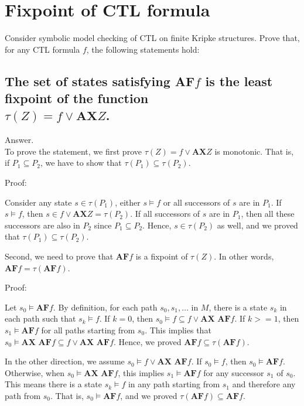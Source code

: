 \documentclass[a4paper,11pt]{article}
\theoremstyle{mytheor}
\begin{document}
\section{Fixpoint of CTL formula}
Consider symbolic model checking of CTL on finite Kripke structures. Prove that, for any CTL formula $f$, the following statements hold:

\subsection{The set of states satisfying AF$f$ is the least fixpoint of the function \\
$\tau(\mathit{Z}) = f \vee \textbf{AX}\mathit{Z}$.}
Answer.
\smallskip \\
To prove the statement, we first prove $\tau(Z) = f \vee \textbf{AX}Z$ is monotonic.
That is, if $P_1 \subseteq P_2$, we have to show that $\tau(P_1) \subseteq \tau(P_2)$. 

\noindent Proof:

Consider any state $s \in \tau(P_1)$, either $s \models f$ or all successors of $s$ are in $P_1$. If $s \models f$, then $s \in f \vee \textbf{AX}Z = \tau(P_2)$. If all successors of $s$ are in $P_1$, then all these successors are also in $P_2$ since $P_1 \subseteq P_2$. Hence, $s \in \tau(P_2)$ as well, and we proved that $\tau(P_1) \subseteq \tau(P_2)$.

\bigskip
\noindent
Second, we need to prove that $\textbf{AF}f$ is a fixpoint of $\tau(Z)$.
In other words, $\textbf{AF}f = \tau(\textbf{AF}f)$.

\noindent Proof:

Let $s_0 \models \textbf{AF}f$.
By definition, for each path $s_0, s_1, \dots$ in $M$, there is a state $s_k$
in each path such that $s_k \models f$. If $k=0$, then $s_0 \models f \subseteq
f \vee \textbf{AX\ AF}f$. If $k>=1$, then $s_1 \models \textbf{AF}f$ for all
paths starting from $s_0$. This implies that $s_0 \models \textbf{AX\ AF}f
\subseteq f \vee \textbf{AX\ AF}f$. Hence, we proved $\textbf{AF}f \subseteq
\tau(\textbf{AF}f)$.

In the other direction, we assume $s_0 \models f \vee \textbf{AX\ AF}f$. 
If $s_0 \models f$, then $s_0 \models \textbf{AF}f$. Otherwise, when $s_0
\models \textbf{AX\ AF}f$, this implies $s_1 \models \textbf{AF}f$ for any
successor $s_1$ of $s_0$. This means there is a state $s_k \models f$ in
any path starting from $s_1$ and therefore any path from $s_0$. That is, 
$s_0 \models \textbf{AF}f$, and we proved $\tau(\textbf{AF}f) \subseteq
\textbf{AF}f$.
\end{document}
